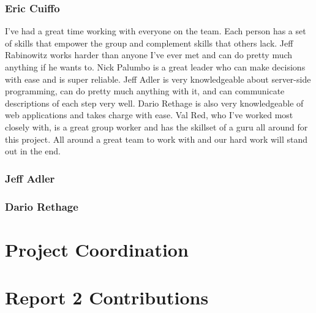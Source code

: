 \subsubsection{Eric Cuiffo} 
I've had a great time working with everyone on the team. Each person has a set of skills that empower the group and complement skills that others lack. Jeff Rabinowitz works harder than anyone I've ever met and can do pretty much anything if he wants to. Nick Palumbo is a great leader who can make decisions with ease and is super reliable. Jeff Adler is very knowledgeable about server-side programming, can do pretty much anything with it, and can communicate descriptions of each step very well. Dario Rethage is also very knowledgeable of web applications and takes charge with ease. Val Red, who I've worked most closely with, is a great group worker and has the skillset of a guru all around for this project. All around a great team to work with and our hard work will stand out in the end.\\

\subsubsection{Jeff Adler}

\subsubsection{Dario Rethage}


\section{Project Coordination}


\section{Report 2 Contributions}
